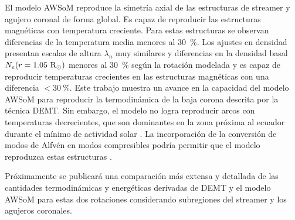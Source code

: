\documentclass[baaa]{baaa}
\begin{document}
El modelo AWSoM reproduce la simetría axial de las estructuras de streamer y agujero coronal de forma global. Es capaz 
de reproducir las estructuras magnéticas con temperatura creciente. Para estas estructuras se observan diferencias de 
la temperatura media menores al 30~\%. Los ajustes en densidad presentan escalas de altura $\lambda_n$ muy similares y 
diferencias en la densidad basal $N_e(r=1.05~{\rm R_\odot})$  menores al 30~\% según la rotación modelada y es capaz de 
reproducir temperaturas crecientes en las estructuras magnéticas con una diferencia $<30~\%$.  Este trabajo muestra un 
avance en la capacidad del modelo AWSoM para reproducir la 
termodinámica de la baja corona descrita por la técnica DEMT. Sin embargo, el modelo no logra reproducir arcos con 
temperaturas decrecientes, que son dominantes en la zona próxima al ecuador durante el mínimo de actividad solar 
\citep{nuevo_2013}.  La incorporación de la conversión de modos de Alfvén en modos compresibles podría permitir que el 
modelo reproduzca estas estructuras \citep{schiff_2016}.

Próximamente se publicará una comparación más extensa y detallada de las cantidades termodinámicas y energéticas derivadas de DEMT y el modelo AWSoM para estas dos rotaciones considerando subregiones del streamer y los agujeros coronales.




\small

 
\end{document}
